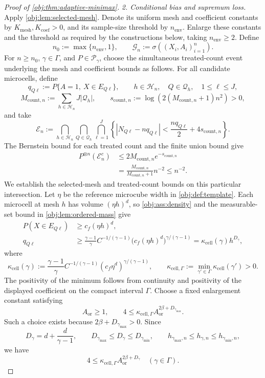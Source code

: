 \documentclass[11pt]{article}
\begin{document}
\begin{proof}[Proof of \cref{obj:thm:adaptive-minimax}]
\emph{2. Conditional bias and supremum loss.}
Apply \cref{obj:lem:selected-mesh}. Denote its uniform mesh and coefficient constants by \(K_{\mathrm{mesh}},K_{\mathrm{coef}}>0\), and its sample-size threshold by \(n_{\mathrm{env}}\). Enlarge these constants and the threshold as required by the constructions below, taking \(n_{\mathrm{env}}\ge2\). Define
\[
n_0:=\max\{n_{\mathrm{env}},1\},
\qquad
\mathcal G_n:=\sigma((X_i,A_i)_{i=1}^n).
\]
For \(n\ge n_0\), \(\gamma\in\Gamma\), and \(P\in\mathcal P_\gamma\), choose the simultaneous treated-count event underlying the mesh and coefficient bounds as follows. For all candidate microcells, define
\[
q_{Q\ell}:=P\{A=1,\ X\in E_{Q\ell}\},
\qquad h\in\mathcal H_n,\quad Q\in\mathcal Q_h,\quad 1\le\ell\le J,
\]
\[
M_{\mathrm{count},n}
:=\sum_{h\in\mathcal H_n}J|\mathcal Q_h|,
\qquad
s_{\mathrm{count},n}
:=\log\!\left(2(M_{\mathrm{count},n}+1)n^2\right)>0,
\]
and take
\[
\mathcal E_n
:=
\bigcap_{h\in\mathcal H_n}
\bigcap_{Q\in\mathcal Q_h}
\bigcap_{\ell=1}^J
\left\{
\left|N_{Q\ell}-nq_{Q\ell}\right|
<\frac{nq_{Q\ell}}2+4s_{\mathrm{count},n}
\right\}.
\]
The Bernstein bound for each treated count and the finite union bound give
\[
\begin{aligned}
P^{\otimes n}(\mathcal E_n^c)
&\le 2M_{\mathrm{count},n}e^{-s_{\mathrm{count},n}}
\\
&=\frac{M_{\mathrm{count},n}}{M_{\mathrm{count},n}+1}n^{-2}
\le n^{-2}.
\end{aligned}
\]
We establish the selected-mesh and treated-count bounds on this particular intersection. Let \(\eta\) be the reference microcube width in \cref{obj:def:template}. Each microcell at mesh \(h\) has volume \((\eta h)^d\), so \cref{obj:ass:density} and the measurable-set bound in \cref{obj:lem:ordered-mass} give
\[
\begin{aligned}
P(X\in E_{Q\ell})&\ge c_f(\eta h)^d,\\
q_{Q\ell}
&\ge \frac{\gamma-1}{\gamma}C^{-1/(\gamma-1)}
\bigl(c_f(\eta h)^d\bigr)^{\gamma/(\gamma-1)}
=\kappa_{\mathrm{cell}}(\gamma)h^{D_\gamma},
\end{aligned}
\]
where
\[
\kappa_{\mathrm{cell}}(\gamma)
:=\frac{\gamma-1}{\gamma}C^{-1/(\gamma-1)}
(c_f\eta^d)^{\gamma/(\gamma-1)},
\qquad
\kappa_{\mathrm{cell},\Gamma}
:=\min_{\gamma'\in\Gamma}\kappa_{\mathrm{cell}}(\gamma')>0.
\]
The positivity of the minimum follows from continuity and positivity of the displayed coefficient on the compact interval \(\Gamma\). Choose a fixed enlargement constant satisfying
\[
A_{\mathrm{or}}\ge1,
\qquad
4\le\kappa_{\mathrm{cell},\Gamma}
A_{\mathrm{or}}^{2\beta+D_{\gamma_{\max}}}.
\]
Such a choice exists because \(2\beta+D_{\gamma_{\max}}>0\). Since
\[
D_\gamma=d+\frac d{\gamma-1},
\qquad
D_{\gamma_{\max}}\le D_\gamma\le D_{\gamma_{\min}},
\qquad
h_{\gamma_{\max},n}\le h_{\gamma,n}\le h_{\gamma_{\min},n},
\]
we have
\[
4\le\kappa_{\mathrm{cell},\Gamma}
A_{\mathrm{or}}^{2\beta+D_\gamma}
\quad(\gamma\in\Gamma).
\]


\end{proof}
\end{document}
